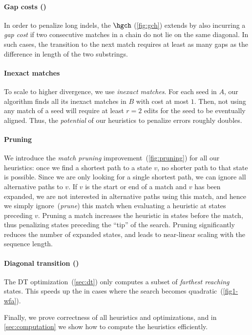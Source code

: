 \paragraph{Gap costs (\GCH)} In order to penalize long indels, the \gch $\hgch$
(\cref{fig:gch}) extends \csh by also incurring a \emph{gap cost} if two
consecutive matches in a chain do not lie on the same diagonal. In such cases,
the transition to the next match requires at least as many gaps as the
difference in length of the two substrings.

\paragraph{Inexact matches} To scale to higher divergence, we use
\emph{inexact matches}. For each seed in $A$, our algorithm finds all its inexact
matches in $B$ with cost at most $1$. Then, not using any match of a seed will
require at least $r{=}2$ edits for the seed to be eventually aligned. Thus, the
\emph{potential} of our heuristics to penalize errors roughly doubles.

\paragraph{Pruning} We introduce the \emph{match pruning}
improvement~(\cref{fig:pruning}) for all our heuristics: once we find a shortest
path to a state $v$, no shorter path to that state is possible. Since we are
only looking for a single shortest path, we can ignore all alternative paths to
$v$. If $v$ is the start or end of a match and $v$ has been expanded, we are not
interested in alternative paths using this match, and hence we simply
ignore~(\emph{prune}) this match when evaluating a heuristic at states preceding
$v$. Pruning a match increases the heuristic in states before the match, thus
penalizing states preceding the ``tip'' of the \A search. Pruning significantly
reduces the number of expanded states, and leads to near-linear scaling with the
sequence length.

\paragraph{Diagonal transition (\DT)}
The DT optimization~(\cref{sec:dt}) only computes a subset of \emph{farthest
reaching} states. This speeds up the \A in cases where the search becomes
quadratic~(\cref{fig1-wfa}).

Finally, we prove correctness of all heuristics and optimizations, and
in \cref{sec:computation} we show how to compute the heuristics efficiently.
